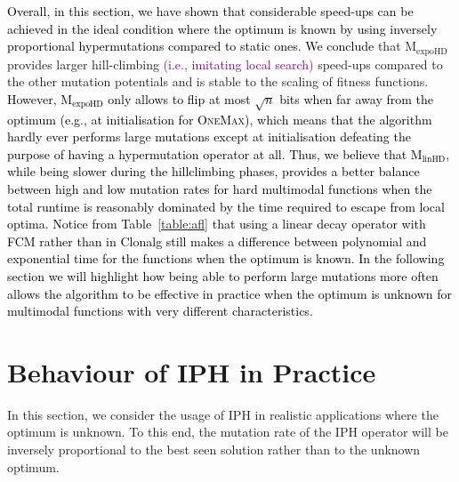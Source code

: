 \documentclass[lettersize,journal]{IEEEtran}
\newcommand{\new}[1]{\textcolor{black}{#1}}
\newcommand{\rerev}[1]{\textcolor{purple}{#1}}
\newcommand{\linHD}{M$_{\text{linHD}}$}
\newcommand{\expoHD}{M$_{\text{expoHD}}$}
\begin{document}
 \new{Overall, in this section, we have shown that considerable speed-ups can be achieved in the ideal condition where the optimum is known by using inversely proportional hypermutations compared to static ones.
We conclude} that {\expoHD } provides larger hill-climbing \rerev{(i.e., imitating local search)} speed-ups compared to the other mutation potentials and is stable to the scaling of fitness functions.
\new{However, {\expoHD } only allows to flip at most $\sqrt{n}$ bits when far away from the optimum (e.g., at initialisation for \textsc{OneMax}), which means that the algorithm hardly ever performs large mutations except at initialisation defeating the purpose of having a hypermutation operator at all. Thus, we believe that \linHD, while being slower during the hillclimbing phases, provides a better balance between high and low mutation rates for hard multimodal functions when the total runtime is reasonably dominated by the time required to escape from local optima. Notice from Table~\ref{table:afl} that using a linear decay operator with FCM  rather than in Clonalg still makes a difference between polynomial and exponential time for the functions when the optimum is known. In the following section we will highlight how being able to perform large mutations more often allows the algorithm to be effective in practice when the optimum is unknown for multimodal functions with very different characteristics.}

 	
 	\section{Behaviour of IPH in Practice}

In this section, we consider the usage of IPH in realistic applications where the optimum is unknown.
 To this end, the mutation rate of the IPH operator will be inversely proportional to the best seen solution rather than to the unknown optimum. 
 
\end{document}

